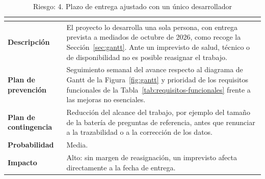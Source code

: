 \documentclass[11pt, a4paper]{report}
\begin{document}
	\begin{table}[H]
		\centering
		\begin{tabularx}{\linewidth}{|>{\bfseries}l|X|}
			\hline
			\rowcolor{riesgo-header}
			\multicolumn{2}{|c|}{\textcolor{white}{\textbf{4. Plazo de entrega ajustado con un único desarrollador}}} \\
			\hline
			Descripción & El proyecto lo desarrolla una sola persona, con entrega prevista a mediados de octubre de 2026, como recoge la Sección~\ref{sec:gantt}. Ante un imprevisto de salud, técnico o de disponibilidad no es posible reasignar el trabajo. \\
			\hline
			\rowcolor{fila-alterna}
			Plan de prevención & Seguimiento semanal del avance respecto al diagrama de Gantt de la Figura~\ref{fig:gantt} y prioridad de los requisitos funcionales de la Tabla~\ref{tab:requisitos-funcionales} frente a las mejoras no esenciales. \\
			\hline
			Plan de contingencia & Reducción del alcance del trabajo, por ejemplo del tamaño de la batería de preguntas de referencia, antes que renunciar a la trazabilidad o a la corrección de los datos. \\
			\hline
			\rowcolor{fila-alterna}
			Probabilidad & Media. \\
			\hline
			Impacto & Alto: sin margen de reasignación, un imprevisto afecta
			directamente a la fecha de entrega. \\
			\hline
		\end{tabularx}
		\caption{Riesgo: 4. Plazo de entrega ajustado con un único desarrollador}
		\label{tab:riesgo-plazo}
	\end{table}
\end{document}
